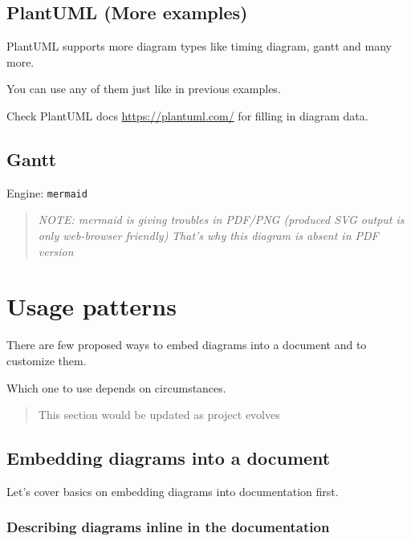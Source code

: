 \documentclass[
  12pt,
  a4paper,
  12pt,
  oneside,
  openany]{book}
\begin{document}
\newpage

\hypertarget{kroki-pumlMore}{%
\section{PlantUML (More examples)}\label{kroki-pumlMore}}

PlantUML supports more diagram types like timing diagram, gantt and many more.

You can use any of them just like in previous examples.

Check PlantUML docs \url{https://plantuml.com/} for filling in diagram data.

\newpage

\hypertarget{kroki-gantt}{%
\section{Gantt}\label{kroki-gantt}}

Engine: \texttt{mermaid}

\begin{quote}
\emph{NOTE: mermaid is giving troubles in PDF/PNG (produced SVG output is only web-browser friendly)} \emph{That's why this diagram is absent in PDF version}
\end{quote}

\hypertarget{usage}{%
\chapter{Usage patterns}\label{usage}}

There are few proposed ways to embed diagrams into a document and to customize them.

Which one to use depends on circumstances.

\begin{quote}
This section would be updated as project evolves
\end{quote}

\hypertarget{usage-embed}{%
\section{Embedding diagrams into a document}\label{usage-embed}}

Let's cover basics on embedding diagrams into documentation first.

\hypertarget{usage-embed-inline}{%
\subsection{Describing diagrams inline in the documentation}\label{usage-embed-inline}}
\end{document}
